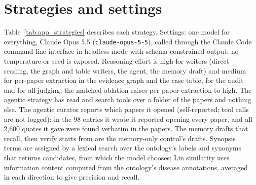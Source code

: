 \documentclass{article} %
\begin{document}
\section{Strategies and settings}
\label{app:settings}
Table~\ref{tab:app_strategies} describes each strategy. Settings: one model for everything, Claude Opus 5.5 (\texttt{claude-opus-5-5}), called through the Claude Code command-line interface in headless mode with schema-constrained output; no temperature or seed is exposed. Reasoning effort is high for writers (direct reading, the graph and table writers, the agent, the memory draft) and medium for per-paper extraction in the evidence graph and the case table, for the audit and for all judging; the matched ablation raises per-paper extraction to high. The agentic strategy has read and search tools over a folder of the papers and nothing else. The agentic curator reports which papers it opened (self-reported; tool calls are not logged): in the 98 entries it wrote it reported opening every paper, and all 2,600 quotes it gave were found verbatim in the papers. The memory drafts that recall, then verify starts from are the memory-only control's drafts. Synopsis terms are assigned by a lexical search over the ontology's labels and synonyms that returns candidates, from which the model chooses; Lin similarity uses information content computed from the ontology's disease annotations, averaged in each direction to give precision and recall.
\end{document}
